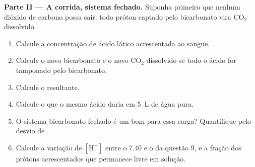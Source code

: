 \begin{problem}
\medskip
\noindent\textbf{Parte II --- A corrida, sistema fechado.}
Suponha primeiro que nenhum dióxido de carbono possa sair: todo próton
captado pelo bicarbonato vira $\mathrm{CO_2}$ dissolvido.
\begin{enumerate}[resume]
  \item Calcule a concentração de ácido lático acrescentada ao sangue.
  \item Calcule o novo bicarbonato e o novo $\mathrm{CO_2}$ dissolvido
        se todo o ácido for tamponado pelo bicarbonato.
  \item Calcule o  resultante.
  \item Calcule o  que o mesmo ácido daria em \qty{5}{L} de água pura.
  \item O sistema bicarbonato fechado é um bom  para essa carga?
        Quantifique pelo desvio de .
  \item Calcule a variação de $[\mathrm{H^+}]$ entre o  7.40 e o  da
        questão 9, e a fração dos prótons acrescentados que permanece
        livre em solução.
\end{enumerate}


\end{problem}
